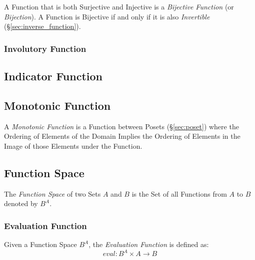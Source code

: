 A Function that is both Surjective and Injective is a \emph{Bijective
  Function} (or \emph{Bijection}). A Function is Bijective if and only
if it is also \emph{Invertible} (\S\ref{sec:inverse_function}).



\subsubsection{Involutory Function}\label{sec:involution}



\subsection{Indicator Function}\label{sec:indicator_function}

\subsection{Monotonic Function}\label{sec:monotonic}

A \emph{Monotonic Function} is a Function between Posets
(\S\ref{sec:poset}) where the Ordering of Elements of the Domain
Implies the Ordering of Elements in the Image of those Elements under
the Function.



\subsection{Function Space}\label{sec:function_space}

The \emph{Function Space} of two Sets $A$ and $B$ is the Set of all
Functions from $A$ to $B$ denoted by $B^A$.



\subsubsection{Evaluation Function}\label{sec:evaluation_function}

Given a Function Space $B^A$, the \emph{Evaluation Function} is
defined as:
\[
  eval : B^A \times A \rightarrow B
\]



